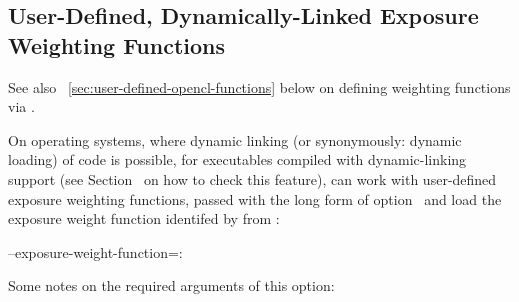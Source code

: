 

\subsection[User-Defined Dynamic Functions]{\label{sec:user-defined-dynlink-functions}%
  User-Defined, Dynamically-Linked Exposure Weighting Functions}

See also \sectionName~\ref{sec:user-defined-opencl-functions} below on defining weighting
functions via .


%
%
%
%
%
%
%
%
On operating systems, where dynamic linking (or synonymously: dynamic loading) of code is
possible, for \App{} executables compiled with dynamic-linking support (see
Section~ on how to check this feature), \App{} can work with
user-defined exposure weighting functions, passed with the long form of
option~ and load the exposure weight function identifed by
 from :

\begin{literal}
  --exposure-weight-function=:\feasiblebreak
\end{literal}

Some notes on the required arguments of this option:

